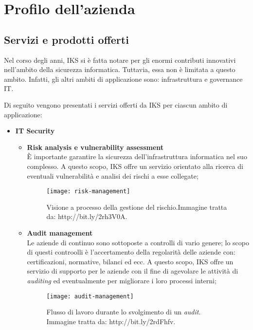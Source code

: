 \section{Profilo dell'azienda}
\subsection{Servizi e prodotti offerti}
Nel corso degli anni, IKS si è fatta notare per gli enormi contributi 
innovativi nell'ambito della sicurezza informatica. Tuttavia, essa non 
è limitata a questo ambito. Infatti, gli altri ambiti di applicazione 
sono: infrastruttura e governance IT. 

Di seguito vengono presentati i servizi offerti da IKS per ciascun ambito di 
applicazione:

\begin{itemize}
	\item \textbf{IT Security}\\
	 \begin{itemize}
	 	\item \textbf{Risk analysis e vulnerability assessment}\\ 
	 	È importante garantire la sicurezza dell'infrastruttura 
		informatica nel suo complesso. A questo scopo, IKS offre un 
		servizio orientato alla ricerca di eventuali vulnerabilità e 
		analisi dei rischi a esse collegate;
	 
	 	\begin{figure}[htbp]
	 		\begin{center}
	 			\texttt{[image: risk-management]}
	 			\caption{Visione a processo della gestione del 
				 rischio.Immagine tratta da: http://bit.ly/2rh3V0A.}
	 		\end{center}
	 	\end{figure}
	 		 	
		\item \textbf{Audit management}\\
		Le aziende di continuo sono sottoposte a controlli di vario 
		genere; lo scopo di questi controolli è l'accertamento della 
		regolarità delle aziende con: certificazioni, normative, bilanci 
		ed ecc. A questo scopo, IKS offre un servizio di supporto per 
		le aziende con il fine di agevolare le attività di \emph{auditing} 
		ed eventualmente per migliorare i loro processi interni;
		\begin{figure}[htbp]
			\begin{center}
				\hspace{3em}
				\texttt{[image: audit-management]}
				\caption{Flusso di lavoro durante lo 
				svolgimento di un \emph{audit}.
				Immagine tratta da: http://bit.ly/2rdFhfv.}
			\end{center}
		\end{figure}
	

\end{itemize}
\end{itemize}
